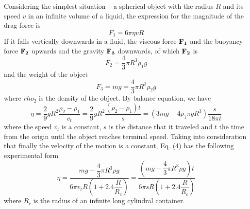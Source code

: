 \documentclass[a4paper]{report}
\begin{document}
	Considering the simplest situation -- a spherical object with the radius $R$ and its speed $v$ in an infinite volume of a liquid, the expression for the magnitude of the drag force is
	\begin{equation}
	F_1=6\pi\eta vR
	\end{equation}
	If it falls vertically downwards in a fluid, the viscous force $\bf{F}_1$ and the buoyancy force $\bf{F}_2$ upwards and the gravity $\bf{F}_3$ downwards, of which $\bf{F}_2$ is
	\begin{equation}
	F_2=\dfrac{4}{3}\pi R^3\rho_1 g
	\end{equation}
	and the weight of the object
	\begin{equation}
	F_3=mg=\dfrac{4}{3}\pi R^3\rho_2g
	\end{equation}
	where $rho_2$ is the density of the object. By balance equation, we have
	\begin{equation}
	\eta=\dfrac{2}{9}gR^2\dfrac{\rho_2-\rho_1}{v_t}=\dfrac{2}{9}gR^2\dfrac{(\rho_2-\rho_1)t}{s}=(3mg-4\rho_1\pi gR^3)\dfrac{s}{18\pi t}
	\end{equation}
	where the speed $v_t$ is a constant, $s$ is the distance that it traveled and $t$ the time from the origin until the object reaches terminal speed. Taking into consideration that finally the velocity of the motion is a constant, Eq. (4) has the following experimental form
	\begin{equation}
	\eta=\dfrac{mg-\dfrac{4}{3}\pi R^3\rho g}{6\pi v_tR(1+2.4\dfrac{R}{R_c})}=\dfrac{(mg-\dfrac{4}{3}\pi R^3\rho g)t}{6\pi sR(1+2.4\dfrac{R}{R_c})}
	\end{equation}
	where $R_c$ is the radius of an infinite long cylindral container.
\end{document}

